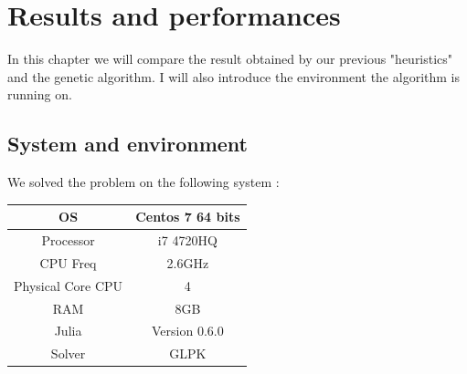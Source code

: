 \documentclass[12pt]{article}
\begin{document}
	\section{Results and performances}
	In this chapter we will compare the result obtained by our previous "heuristics" and the genetic algorithm. I will also introduce the environment the algorithm is running on.
	\subsection{System and environment}
	We solved the problem on the following system :
	\begin{center}
		\begin{tabular}{|c|c|}
			\hline
			OS & Centos 7 64 bits \\
			\hline
			Processor & i7 4720HQ \\
			\hline
			CPU Freq & 2.6GHz \\
			\hline
			Physical Core CPU & 4 \\
			\hline
			RAM & 8GB \\
			\hline
			Julia & Version 0.6.0 \\
			\hline
			Solver & GLPK\\
			\hline
		\end{tabular}
	\end{center}
\end{document}
